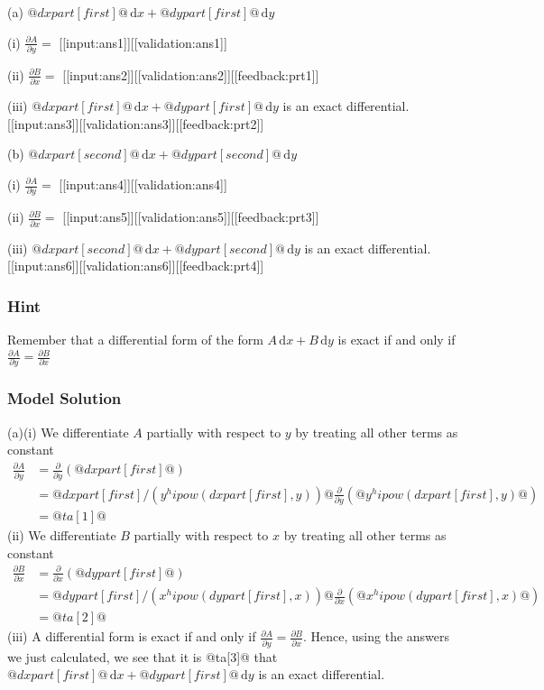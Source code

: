 \documentclass[a4paper,10pt]{article}
\begin{document}
(a) \(@dxpart[first]@ \, \text{d}x + @dypart[first]@ \, \text{d}y\) 

(i) \(\frac{\partial A}{\partial y} = \) [[input:ans1]][[validation:ans1]] 

(ii) \(\frac{\partial B}{\partial x} = \) [[input:ans2]][[validation:ans2]][[feedback:prt1]]

(iii) \(@dxpart[first]@ \, \text{d}x + @dypart[first]@ \, \text{d}y\) is an exact differential. [[input:ans3]][[validation:ans3]][[feedback:prt2]]

(b) \(@dxpart[second]@ \, \text{d}x + @dypart[second]@ \, \text{d}y\)

(i) \(\frac{\partial A}{\partial y} = \) [[input:ans4]][[validation:ans4]]

(ii) \(\frac{\partial B}{\partial x} = \) [[input:ans5]][[validation:ans5]][[feedback:prt3]]

(iii) \(@dxpart[second]@ \, \text{d}x + @dypart[second]@ \, \text{d}y\) is an exact differential. [[input:ans6]][[validation:ans6]][[feedback:prt4]]
\subsubsection{Hint}
Remember that a differential form of the form \(A \, \text{d}x + B \, \text{d}y\) is exact if and only if \(\frac{\partial A}{\partial y} = \frac{\partial B}{\partial x}\)
\subsubsection{Model Solution}
(a)(i) We differentiate \(A\) partially with respect to \(y\) by treating all other terms as constant \begin{align*} \frac{\partial A}{\partial y} &= \frac{\partial}{\partial y} \left( @dxpart[first]@ \right) \\ &= @dxpart[first]/(y^hipow(dxpart[first],y))@ \frac{\partial}{\partial y} \left( @y^hipow(dxpart[first],y)@ \right) \\ &= @ta[1]@ \end{align*}(ii) We differentiate \(B\) partially with respect to \(x\) by treating all other terms as constant \begin{align*} \frac{\partial B}{\partial x} &= \frac{\partial}{\partial x} \left( @dypart[first]@ \right) \\ &= @dypart[first]/(x^hipow(dypart[first],x))@ \frac{\partial}{\partial x} \left( @x^hipow(dypart[first],x)@ \right) \\ &= @ta[2]@ \end{align*}(iii) A differential form is exact if and only if \(\frac{\partial A}{\partial y} = \frac{\partial B}{\partial x}\). Hence, using the answers we just calculated, we see that it is @ta[3]@ that \(@dxpart[first]@ \, \text{d}x + @dypart[first]@ \, \text{d}y\) is an exact differential.
\end{document}
